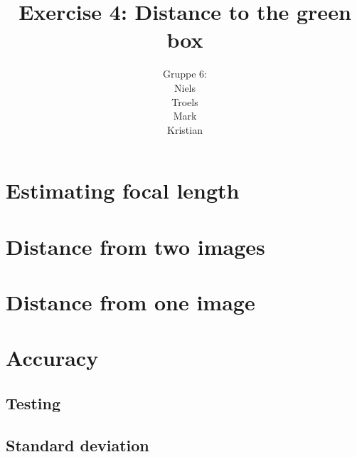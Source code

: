 \documentclass[a4paper,12pt]{article}
\title{Exercise 4: Distance to the green box}
\author{Gruppe 6:\\Niels\\Troels\\Mark\\Kristian}
\begin{document}
\maketitle

\section{Estimating focal length}

\section{Distance from two images}

\section{Distance from one image}

\section{Accuracy}

\subsection{Testing}

\subsection{Standard deviation}
\end{document}
